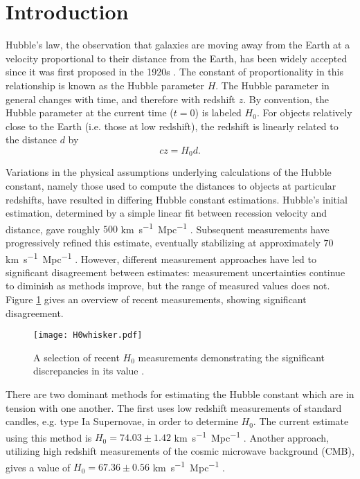 \section{\label{sec:intro} Introduction}

Hubble's law, the observation that galaxies are moving away from the Earth at a velocity proportional to their distance from the Earth, has been widely accepted since it was first proposed in the 1920s \cite{Hubble_1929}.
The constant of proportionality in this relationship is known as the Hubble parameter $H$.
The Hubble parameter in general changes with time, and therefore with redshift $z$. By convention, the Hubble parameter at the current time ($t=0$) is labeled $H_0$.
For objects relatively close to the Earth (i.e. those at low redshift), the redshift is linearly related to the distance $d$ by \cite{Freedman_2010}
\[
    c z = H_0 d.
\]

Variations in the physical assumptions underlying calculations of the Hubble constant, namely those used to compute the distances to objects at particular redshifts, have resulted in differing Hubble constant estimations.
Hubble’s initial estimation, determined by a simple linear fit between recession velocity and distance, gave roughly $500$ \si{km.s^{-1}.Mpc^{-1}} \cite{Hubble_1929}.
Subsequent measurements have progressively refined this estimate, eventually stabilizing at approximately $70$ \si{km.s^{-1}.Mpc^{-1}} \cite{Freedman_2010}.
However, different measurement approaches have led to significant disagreement between estimates: measurement uncertainties continue to diminish as methods improve, but the range of measured values does not.
Figure \ref{fig:hist_h0} gives an overview of recent measurements, showing significant disagreement.

\begin{figure}
    \centering
    \texttt{[image: H0whisker.pdf]}
    \caption{A selection of recent $H_0$ measurements demonstrating the significant discrepancies in its value \cite{Pogosian_2020, Planck_2020, Aiola_2020, WMAP_2018, Henning_2018, Planck_2016, Hinshaw_2013, Freedman_2001, Freedman_2012, Riess_2016, Feeney_2018, Burns_2018,  Riess_2019, Camarena_2020, Riess_2021, Breuval_2021}.}
    \label{fig:hist_h0}
\end{figure}

There are two dominant methods for estimating the Hubble constant which are in tension with one another.
The first uses low redshift measurements of standard candles, e.g. type Ia Supernovae, in order to determine $H_0$.
The current estimate using this method is $H_0 = 74.03 \pm 1.42$ \si{km.s^{-1}.Mpc^{-1}} \cite{Riess_2019}.
Another approach, utilizing high redshift measurements of the cosmic microwave background (CMB), gives a value of $H_0 = 67.36 \pm 0.56$ \si{km.s^{-1}.Mpc^{-1}} \cite{Planck_2020}.

